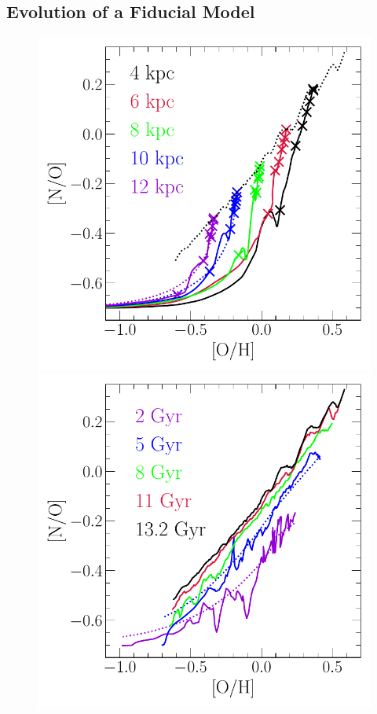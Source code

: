 \subsection{Evolution of a Fiducial Model}
\label{ohno:sec:results:fiducial}

\begin{figure}
\centering
\includegraphics[scale = 0.6]{no_oh_superposition.pdf}
\includegraphics[scale = 0.6]{no_oh_timeevol.pdf}

\end{figure}
